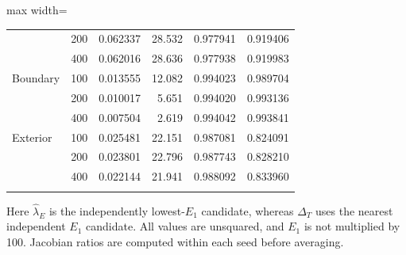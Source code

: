 \begin{table}[p]
\begin{adjustbox}{max width=\linewidth}
\begin{tabular}{llrrrr}
 & 200 & 0.062337 & 28.532 & 0.977941 & 0.919406\\
 & 400 & 0.062016 & 28.636 & 0.977938 & 0.919983\\
\addlinespace[2pt]
Boundary & 100 & 0.013555 & 12.082 & 0.994023 & 0.989704\\
 & 200 & 0.010017 & 5.651 & 0.994020 & 0.993136\\
 & 400 & 0.007504 & 2.619 & 0.994042 & 0.993841\\
\addlinespace[2pt]
Exterior & 100 & 0.025481 & 22.151 & 0.987081 & 0.824091\\
 & 200 & 0.023801 & 22.796 & 0.987743 & 0.828210\\
 & 400 & 0.022144 & 21.941 & 0.988092 & 0.833960\\
\addlinespace[2pt]
\bottomrule
\end{tabular}
\end{adjustbox}
\par\medskip
\begin{minipage}{0.98\linewidth}\footnotesize
Here $\hat\lambda_E$ is the independently lowest-$E_1$ candidate,
whereas $\Delta_T$ uses the nearest independent $E_1$ candidate.
All values are unsquared, and $E_1$ is not multiplied by 100.
Jacobian ratios are computed within each seed before averaging.
\end{minipage}
\endgroup
\end{table}
